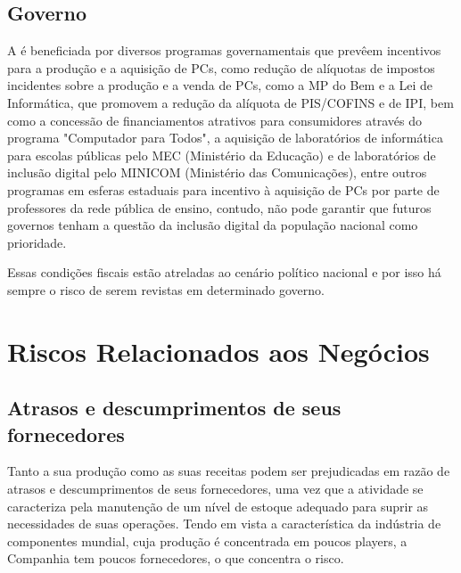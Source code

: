 \subsection{Governo} 
A \nomePositivo{} é beneficiada por diversos programas governamentais que prevêem incentivos para a produção e a aquisição de PCs, como redução de alíquotas de impostos incidentes sobre a produção e a venda de PCs, como a MP do Bem e a Lei de Informática, que promovem a redução da alíquota de PIS/COFINS e de IPI, bem como a concessão de financiamentos atrativos para consumidores através do programa "Computador para Todos", a aquisição de laboratórios de informática para escolas públicas pelo MEC (Ministério da Educação) e de laboratórios de inclusão digital pelo MINICOM (Ministério das Comunicações), entre outros programas em esferas estaduais para incentivo à aquisição de PCs por parte de professores da rede pública de ensino, contudo, não pode garantir que futuros governos tenham a questão da inclusão digital da população nacional como prioridade.

Essas condições fiscais estão atreladas ao cenário político nacional e por isso há sempre o risco de serem revistas em determinado governo.

\section{Riscos Relacionados aos Negócios}

\subsection{Atrasos e descumprimentos de seus fornecedores} 
Tanto a sua produção como as suas receitas podem ser prejudicadas em razão de atrasos e descumprimentos de seus fornecedores, uma vez que a atividade se caracteriza pela manutenção de um nível de estoque adequado para suprir as necessidades de suas operações.  Tendo em vista a característica da indústria de componentes mundial, cuja produção é concentrada em poucos players, a Companhia tem poucos fornecedores, o que concentra o risco.

